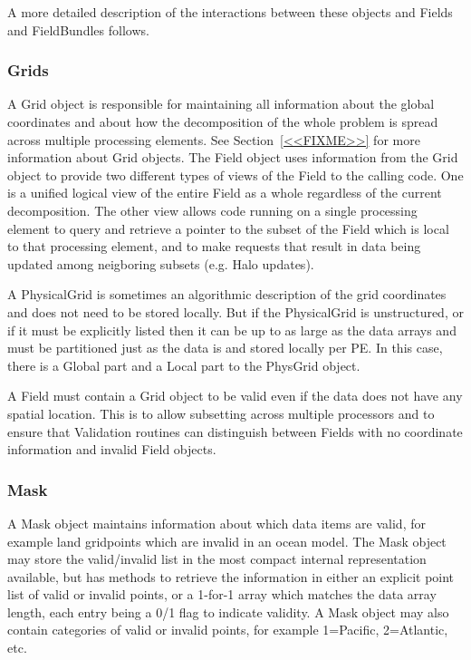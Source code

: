 A more detailed description of the interactions between
these objects and Fields and FieldBundles follows.

\subsubsection{Grids}

A Grid object is responsible for
maintaining all information about the global coordinates and about how
the decomposition of the whole problem is spread across multiple
processing elements.  
See Section~\ref{<<FIXME>>} for more information about Grid objects.  
The Field object uses information from the Grid object to provide
two different types of views of the Field to the calling code.
One is a unified logical view of the entire Field as a whole
regardless of the current decomposition.  The other view allows code
running on a single processing element to query and retrieve a pointer 
to the subset of the Field which is local to that processing element,
and to make requests that result in data being updated among neigboring
subsets (e.g. Halo updates).

A PhysicalGrid is sometimes an algorithmic description of the
grid coordinates and does not need to be stored locally.  But if
the PhysicalGrid is unstructured, or if it must be explicitly
listed then it can be up to as large as the data arrays and
must be partitioned just as the data is and stored locally per PE.
In this case, there is a Global part and a Local part to the PhysGrid
object.

A Field must contain a Grid object to be valid even if the data does not
have any spatial location.  This is to allow subsetting across multiple
processors and to ensure that Validation routines can distinguish between
Fields with no coordinate information and invalid Field objects.

\subsubsection{Mask}

A Mask object maintains information about which data items are
valid, for example land gridpoints which are invalid in an ocean model.
The Mask object may store the valid/invalid list in the most 
compact internal representation available, but has methods to
retrieve the information in either an explicit point list of
valid or invalid points, or a 1-for-1 array which matches the
data array length, each entry being a 0/1 flag to indicate validity.
A Mask object may also contain categories of valid or invalid points, 
for example 1=Pacific, 2=Atlantic, etc.

